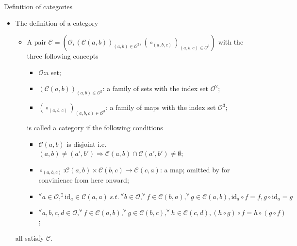 \documentclass[dvipdfmx,10pt,notheorems]{beamer}
\renewcommand{\#}{^\sharp}
\newcommand{\id}{\mbox{id}}
\begin{document}
	\begin{frame}{Definition of categories}
			\begin{itemize}
					\item The definition of a category
							\begin{itemize}
									\item A pair $\mathcal{C}=(\mathcal{O},(\mathcal{C}(a,b))_{(a,b)\in\mathcal{O}^2},
									 (\circ_{(a,b,c)})_{(a,b,c)\in\mathcal{O}^3})$
									with the three following concepts
											\begin{itemize}
													\item $\mathcal{O}$:a set;
													\item $(\mathcal{C}(a,b))_{(a,b)\in\mathcal{O}^2}$:
													a family of sets with the index set $\mathcal{O}^2$;
													\item $(\circ_{(a,b,c)})_{(a,b,c)\in\mathcal{O}^3}$:
													a family of maps with the index set $\mathcal{O}^3$;
											\end{itemize}
									is called a category if the following conditions
											\begin{itemize}
													\item $\mathcal{C}(a,b)$ is disjoint i.e. $(a,b)\neq (a',b')\Rightarrow
													\mathcal{C}(a,b)\cap\mathcal{C}(a',b')\neq\emptyset$;
													\item $\circ_{(a,b,c)}$:$\mathcal{C}(a,b)\times\mathcal{C}(b,c)\rightarrow
													\mathcal{C}(c,a)$:
													a map; omitted by for convinience from here onward;
													\item $^\forall a\in\mathcal{O}, ^\exists \id_a\in\mathcal{C}(a,a)~s.t.~
													^\forall b\in\mathcal{O}, ^\forall f\in\mathcal{C}(b,a),
													^\forall g\in\mathcal{C}(a,b), \id_a\circ f=f, g\circ\id_a=g$
													\item  $^\forall a,b,c,d\in\mathcal{O}, ^\forall f\in\mathcal{C}(a,b),
													 ^\forall g \in \mathcal{C}(b,c), ^\forall h \in\mathcal{C}(c,d),
													(h\circ g)\circ f=h\circ (g\circ f)$;
											\end{itemize}
							\end{itemize}
					all satisfy $\mathcal{C}$.
			\end{itemize}
	\end{frame}
\end{document}

